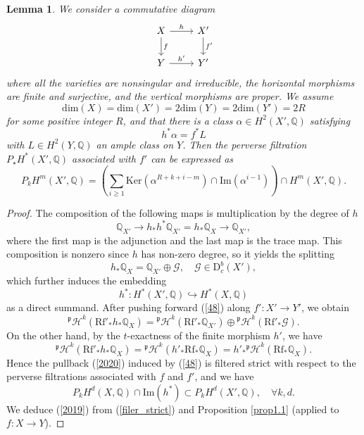 \documentclass[11pt]{amsart}
\theoremstyle{plain}
\newtheorem{lem}[thm]{Lemma}
\theoremstyle{definition}
\theoremstyle{remark}
\newcommand{\BQ}{{\mathbb{Q}}}
\newcommand{\CG}{{\mathcal G}}
\newcommand{\CH}{{\mathcal H}}
\begin{document}
\begin{lem}
We consider a commutative diagram 
\begin{equation*}
    \begin{tikzcd}
X\arrow{r}{h} \arrow{d}{f} & X'\arrow{d}{f'} \\
 Y \arrow{r}{h'} & Y'
\end{tikzcd} 
\end{equation*}
where all the varieties are nonsingular and irreducible, the horizontal morphisms are finite and surjective, and the vertical morphisms are proper. We assume 
\[
\mathrm{dim}(X) = \mathrm{dim}(X') = 2 \mathrm{dim}(Y) = 2\mathrm{dim}(Y') =2R
\]
for some positive integer $R$, and that there is a class $\alpha \in H^2(X', \BQ)$ satisfying
\[
h^* \alpha = f^* L
\]
with $L \in H^2(Y, \BQ)$ an ample class on $Y$. Then the perverse filtration $P_\star H^*(X', \BQ)$ associated with $f'$ can be expressed as
\begin{equation}\label{2019}
P_kH^m(X', \BQ) = \left(\sum_{i\geq 1} \mathrm{Ker}(\alpha^{R+k+i-m}) \cap \mathrm{Im}(\alpha^{i-1}) \right) \cap H^m(X', \BQ).
\end{equation}
\end{lem}

\begin{proof}
The composition of the following maps is multiplication by the degree of $h$
\[
\BQ_{X'} \to h_*h^* \BQ_{X'} = h_*\BQ_X \to \BQ_{X'},
\]
where the first map is the adjunction and the last map is the trace map. This composition is nonzero since $h$ has non-zero degree, so it yields the splitting
\begin{equation}\label{48}
h_* \BQ_X = \BQ_{X'} \oplus \CG, \quad \CG \in \mathrm{D}^b_c(X'),
\end{equation}
which further induces the embedding 
\begin{equation}\label{2020}
h^*: H^*(X', \BQ) \hookrightarrow H^*(X, \BQ) 
\end{equation}
as a  direct summand. After pushing forward (\ref{48}) along $f': X' \to Y'$, we obtain
\[
{^\mathfrak{p} \CH}^k(\mathrm{Rf'}_\ast h_\ast \BQ_X) = {^\mathfrak{p} \CH}^k(\mathrm{Rf'}_\ast \BQ_{X'}) \oplus {^\mathfrak{p} \CH}^k(\mathrm{Rf'}_\ast \CG).
\]
On the other hand, by the $t$-exactness of the finite morphism $h'$, we have
\[
{^\mathfrak{p} \CH}^k(\mathrm{Rf'}_\ast h_\ast \BQ_X) = {^\mathfrak{p} \CH}^k(h'_*\mathrm{Rf}_\ast \BQ_X)  =h'_* {^\mathfrak{p} \CH}^k(\mathrm{Rf}_\ast \BQ_X).
\]
Hence the pullback (\ref{2020}) induced by (\ref{48}) is filtered strict with respect to the perverse filtrations associated with $f$ and $f'$, and we have 
\begin{equation}\label{filer_strict}
P_kH^d(X, \BQ) \cap \mathrm{Im}(h^*) \subset P_kH^d(X', \BQ),\quad \forall k,d.
\end{equation}
We deduce (\ref{2019}) from (\ref{filer_strict}) and Proposition \ref{prop1.1} (applied to $f: X\to Y$).
\end{proof}
\end{document}
